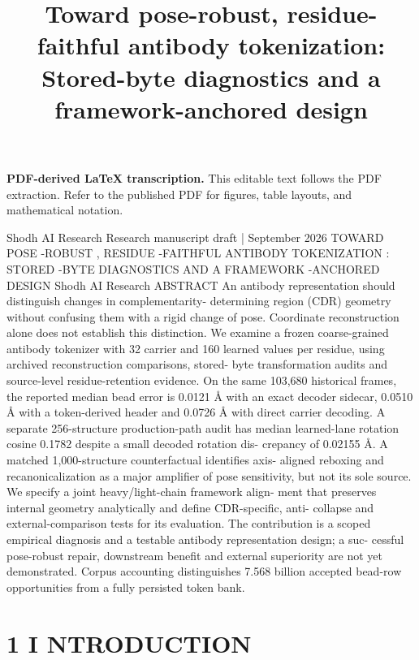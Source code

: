 \documentclass[11pt]{article}
\title{Toward pose-robust, residue-faithful antibody tokenization: Stored-byte diagnostics and a framework-anchored design}
\author{}
\date{}
\begin{document}
\maketitle
\noindent\textbf{PDF-derived LaTeX transcription.} This editable text follows the PDF extraction. Refer to the published PDF for figures, table layouts, and mathematical notation.


Shodh AI Research Research manuscript draft | September 2026
TOWARD POSE -ROBUST , RESIDUE -FAITHFUL
ANTIBODY TOKENIZATION :
STORED -BYTE DIAGNOSTICS AND A
FRAMEWORK -ANCHORED DESIGN
Shodh AI Research
ABSTRACT
An antibody representation should distinguish changes in complementarity-
determining region (CDR) geometry without confusing them with a rigid change
of pose. Coordinate reconstruction alone does not establish this distinction. We
examine a frozen coarse-grained antibody tokenizer with 32 carrier and 160
learned values per residue, using archived reconstruction comparisons, stored-
byte transformation audits and source-level residue-retention evidence. On the
same 103,680 historical frames, the reported median bead error is 0.0121 Å with
an exact decoder sidecar, 0.0510 Å with a token-derived header and 0.0726 Å
with direct carrier decoding. A separate 256-structure production-path audit has
median learned-lane rotation cosine 0.1782 despite a small decoded rotation dis-
crepancy of 0.02155 Å. A matched 1,000-structure counterfactual identifies axis-
aligned reboxing and recanonicalization as a major amplifier of pose sensitivity,
but not its sole source. We specify a joint heavy/light-chain framework align-
ment that preserves internal geometry analytically and define CDR-specific, anti-
collapse and external-comparison tests for its evaluation. The contribution is a
scoped empirical diagnosis and a testable antibody representation design; a suc-
cessful pose-robust repair, downstream benefit and external superiority are not yet
demonstrated. Corpus accounting distinguishes 7.568 billion accepted bead-row
opportunities from a fully persisted token bank.

\section*{1 I NTRODUCTION}
\end{document}
